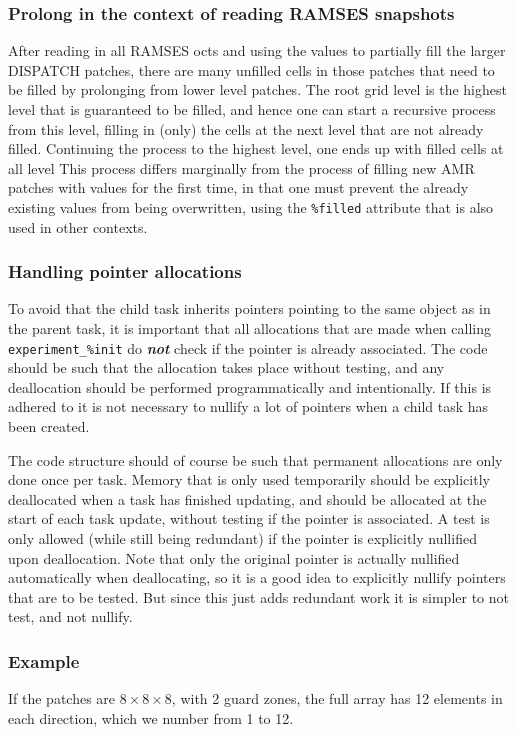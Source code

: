 \documentclass[paper=a4,fontsize=11pt]{scrartcl}
\numberwithin{equation}{section}		%
\numberwithin{figure}{section}			%
\numberwithin{table}{section}				%
\newcommand{\codecolor}{\color{Blue}}
\newcommand{\Code}[1]{{\codecolor\texttt{#1}}}
\begin{document}
\subsubsection{Prolong in the context of reading RAMSES snapshots}
After reading in all RAMSES octs and using the values to partially fill the larger DISPATCH patches, there are many unfilled cells in those patches that need to be filled by prolonging from lower level patches.  The root grid level is the highest level that is guaranteed to be filled, and hence one can start a recursive process from this level, filling in (only) the cells at the next level that are not already filled.  Continuing the process to the highest level, one ends up with filled cells at all level
This process differs marginally from the process of filling new AMR patches with values for the first time, in that one must prevent the already existing values from being overwritten, using the \Code{\%filled} attribute that is also used in other contexts.

\subsubsection{Handling pointer allocations}
To avoid that the child task inherits pointers pointing to the same object as in the parent task, it is important that all allocations that are made when calling \Code{experiment\_\%init} do \textbf{\textit{not}} check if the pointer is already associated.  The code should be such that the allocation takes place without testing, and any deallocation should be performed  programmatically and intentionally.   If this is adhered to it is not necessary to nullify a lot of pointers when a child task has been created.  

The code structure should of course be such that permanent allocations are only done once per task.  Memory that is only used temporarily should be explicitly deallocated when a task has finished updating, and should be allocated at the start of each task update, without testing if the pointer is associated.   A test is only allowed (while still being redundant) if the pointer is explicitly nullified upon deallocation.  Note that only the original pointer is actually nullified automatically when deallocating, so it is a good idea to explicitly nullify pointers that are to be tested.  But since this just adds redundant work it is simpler to not test, and not nullify.

\subsubsection{Example}
If the patches are $8\times 8\times 8$, with 2 guard zones, the full array has 12 elements in each direction, which we number from 1 to 12.
\end{document}
